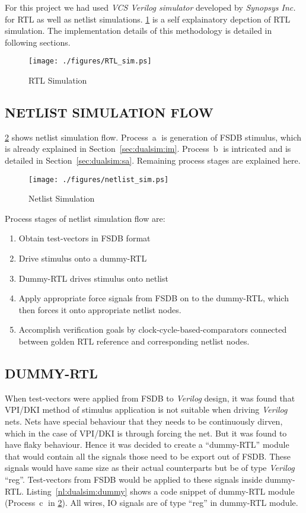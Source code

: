 For this project we had used {\it VCS Verilog simulator} developed by {\it Synopsys Inc.} for RTL as well as netlist simulations. \figurename{\ref{fig:RTL_sim.eps}} is a self explainatory depction of RTL simulation. The implementation details of this methodology is detailed in following sections. 

\begin{figure}[h]
\centering
\texttt{[image: ./figures/RTL\_sim.ps]}
\caption{RTL Simulation}
\label{fig:RTL_sim.eps}
\end{figure}


\subsection{NETLIST SIMULATION FLOW}
\figurename{\ref{fig:netlist_sim.ps}} shows netlist simulation flow. Process~\textcircled{a} is generation of FSDB stimulus, which is already explained in Section~\ref{sec:dualsim:im}. Process~\textcircled{b} is intricated and is detailed in Section~\ref{sec:dualsim:sa}. Remaining process stages are explained here.

\begin{figure}[h]
\centering
\texttt{[image: ./figures/netlist\_sim.ps]}
\caption{Netlist Simulation}
\label{fig:netlist_sim.ps}
\end{figure}

Process stages of netlist simulation flow are:
\begin{enumerate}
	\item Obtain test-vectors in FSDB format
	\item Drive stimulus onto a dummy-RTL
	\item Dummy-RTL drives stimulus onto netlist
	\item Apply appropriate force signals from FSDB on to the dummy-RTL, which then forces it onto appropriate netlist nodes.
	\item Accomplish verification goals by clock-cycle-based-comparators connected between golden RTL reference and corresponding netlist nodes.
\end{enumerate}

\subsection{DUMMY-RTL}
When test-vectors were applied from FSDB to {\it Verilog} design, it was found that VPI/DKI method of stimulus application is not suitable when driving {\it Verilog} nets. Nets have special behaviour that they needs to be continuously dirven, which in the case of VPI/DKI is through forcing the net. But it was found to have flaky behaviour. Hence it was decided to create a ``dummy-RTL'' module that would contain all the signals those need to be export out of FSDB. These signals would have same size as their actual counterparts but be of type {\it Verilog} ``reg''. Test-vectors from FSDB would be applied to these signals inside dummy-RTL. Listing~\ref{nl:dualsim:dummy} shows a code snippet of dummy-RTL module (Process~\textcircled{c} in \figurename{\ref{fig:netlist_sim.ps}}). All wires, IO signals are of type ``reg'' in dummy-RTL module.

